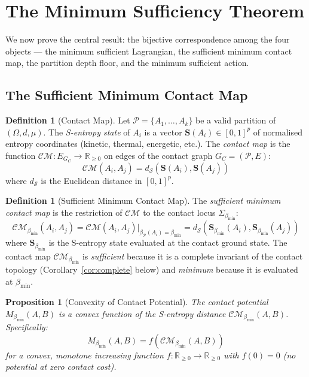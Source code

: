 \documentclass[12pt, a4paper]{article}
\theoremstyle{plain}
\newtheorem{proposition}[theorem]{Proposition}
\theoremstyle{definition}
\newtheorem{definition}[theorem]{Definition}
\theoremstyle{remark}
\newcommand{\bmin}{\beta_{\min}}
\newcommand{\CM}{\mathcal{CM}}
\newcommand{\dS}{d_{\mathcal{S}}}
\newcommand{\reals}{\mathbb{R}}
\newcommand{\Pcal}{\mathcal{P}}
\begin{document}
\section{The Minimum Sufficiency Theorem}
\label{sec:mst}

We now prove the central result: the bijective correspondence among the four
objects --- the minimum sufficient Lagrangian, the sufficient minimum contact
map, the partition depth floor, and the minimum sufficient action.

\subsection{The Sufficient Minimum Contact Map}

\begin{definition}[Contact Map]
\label{def:contactmap}
Let $\Pcal = \{A_1, \ldots, A_k\}$ be a valid partition of $(\Omega, d, \mu)$.
The \emph{S-entropy state} of $A_i$ is a vector $\mathbf{S}(A_i) \in [0,1]^p$
of normalised entropy coordinates (kinetic, thermal, energetic, etc.).
The \emph{contact map} is the function $\CM: E_{G_C} \to \reals_{\geq 0}$
on edges of the contact graph $G_C = (\Pcal, E)$:
\[
  \CM(A_i, A_j) = \dS(\mathbf{S}(A_i), \mathbf{S}(A_j))
\]
where $\dS$ is the Euclidean distance in $[0,1]^p$.
\end{definition}

\begin{definition}[Sufficient Minimum Contact Map]
\label{def:smcm}
The \emph{sufficient minimum contact map} is the restriction of $\CM$ to the
contact locus $\Sigma_{\bmin}$:
\[
  \CM_{\bmin}(A_i, A_j) = \CM(A_i, A_j)\big|_{\beta_\Pcal(A_i) = \bmin}
  = \dS(\mathbf{S}_{\bmin}(A_i), \mathbf{S}_{\bmin}(A_j))
\]
where $\mathbf{S}_{\bmin}$ is the S-entropy state evaluated at the contact
ground state. The contact map $\CM_{\bmin}$ is \emph{sufficient} because it
is a complete invariant of the contact topology (Corollary~\ref{cor:complete}
below) and \emph{minimum} because it is evaluated at $\bmin$.
\end{definition}

\begin{proposition}[Convexity of Contact Potential]
\label{prop:convex}
The contact potential $M_{\bmin}(A,B)$ is a convex function of the S-entropy
distance $\CM_{\bmin}(A,B)$. Specifically:
\[
  M_{\bmin}(A,B) = f\!\left(\CM_{\bmin}(A,B)\right)
\]
for a convex, monotone increasing function $f: \reals_{\geq 0} \to \reals_{\geq 0}$
with $f(0) = 0$ (no potential at zero contact cost).
\end{proposition}
\end{document}
